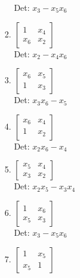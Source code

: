 \documentclass[12pt]{article}
\begin{document}
\begin{enumerate}
\begin{enumerate}
\begin{enumerate}
Det: $x_{3} - x_{5} x_{6}$\\


\item $\displaystyle \left[\begin{matrix}1 & x_{4}\\x_{6} & x_{2}\end{matrix}\right]$\\

Det: $x_{2} - x_{4} x_{6}$\\


\item $\displaystyle \left[\begin{matrix}x_{6} & x_{5}\\1 & x_{3}\end{matrix}\right]$\\

Det: $x_{3} x_{6} - x_{5}$\\


\item $\displaystyle \left[\begin{matrix}x_{6} & x_{4}\\1 & x_{2}\end{matrix}\right]$\\

Det: $x_{2} x_{6} - x_{4}$\\


\item $\displaystyle \left[\begin{matrix}x_{5} & x_{4}\\x_{3} & x_{2}\end{matrix}\right]$\\

Det: $x_{2} x_{5} - x_{3} x_{4}$\\


\item $\displaystyle \left[\begin{matrix}1 & x_{6}\\x_{5} & x_{3}\end{matrix}\right]$\\

Det: $x_{3} - x_{5} x_{6}$\\


\item $\displaystyle \left[\begin{matrix}1 & x_{5}\\x_{5} & 1\end{matrix}\right]$\\


\end{enumerate}
\end{enumerate}
\end{enumerate}
\end{document}
